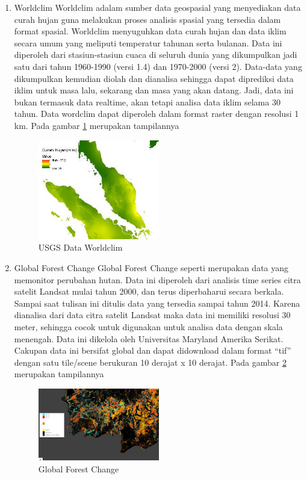 \begin{enumerate}
\item Worldclim
Worldclim adalam sumber data geospasial yang menyediakan data curah hujan guna melakukan proses analisis spasial yang tersedia dalam format spasial. Worldclim menyuguhkan data curah hujan dan data iklim secara umum yang meliputi temperatur tahunan serta bulanan. Data ini diperoleh dari stasiun-stasiun cuaca di seluruh dunia yang dikumpulkan jadi satu dari tahun 1960-1990 (versi 1.4) dan 1970-2000 (versi 2). Data-data yang dikumpulkan kemudian diolah dan dianalisa sehingga dapat diprediksi data iklim untuk masa lalu, sekarang dan masa yang akan datang. Jadi, data ini bukan termasuk data realtime, akan tetapi analisa data iklim selama 30 tahun. Data wordclim dapat diperoleh dalam format raster dengan resolusi 1 km.  Pada gambar \ref{labelgambar3} merupakan tampilannya  

\begin{figure}[ht]
\centering
\includegraphics[width=0.5\textwidth]{pictures/data_worldclim}
\caption{USGS Data Worldclim}
\label{labelgambar3}
\end{figure}

\item Global Forest Change
Global Forest Change seperti merupakan data yang memonitor perubahan hutan. Data ini diperoleh dari analisis time series citra satelit Landsat mulai tahun 2000, dan terus diperbaharui secara berkala.  Sampai saat tulisan ini ditulis data yang tersedia sampai tahun 2014. Karena dianalisa dari data citra satelit Landsat maka data ini memiliki resolusi 30 meter, sehingga cocok untuk digunakan untuk analisa data dengan skala menengah. Data ini dikelola oleh Universitas Maryland Amerika Serikat. Cakupan data ini bersifat global dan dapat didownload dalam format “tif” dengan satu tile/scene berukuran 10 derajat x 10 derajat. Pada gambar \ref{labelgambar4} merupakan tampilannya
\begin{figure}[ht]
\centering
\includegraphics[width=0.5\textwidth]{pictures/Global_Forest_Change}
\caption{Global Forest Change}
\label{labelgambar4}
\end{figure}


\end{enumerate}
